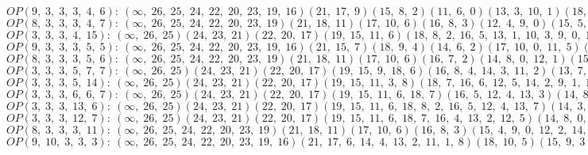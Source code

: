 $OP(9, \;3, \;3, \;3, \;4, \;6): \:(\infty, \;26, \;25, \;24, \;22, \;20, \;23, \;19, \;16)(21, \;17, \;9)(15, \;8, \;2)(11, \;6, \;0)(13, \;3, \;10, \;1)(18, \;7, \;12, \;4, \;14, \;5)$\\
$OP(8, \;3, \;3, \;3, \;4, \;7): \:(\infty, \;26, \;25, \;24, \;22, \;20, \;23, \;19)(21, \;18, \;11)(17, \;10, \;6)(16, \;8, \;3)(12, \;4, \;9, \;0)(15, \;5, \;14, \;2, \;13, \;7, \;1)$\\
$OP(3, \;3, \;3, \;4, \;15): \:(\infty, \;26, \;25)(24, \;23, \;21)(22, \;20, \;17)(19, \;15, \;11, \;6)(18, \;8, \;2, \;16, \;5, \;13, \;1, \;10, \;3, \;9, \;0, \;12, \;4, \;14, \;7)$\\
$OP(9, \;3, \;3, \;3, \;5, \;5): \:(\infty, \;26, \;25, \;24, \;22, \;20, \;23, \;19, \;16)(21, \;15, \;7)(18, \;9, \;4)(14, \;6, \;2)(17, \;10, \;0, \;11, \;5)(13, \;8, \;1, \;12, \;3)$\\
$OP(8, \;3, \;3, \;3, \;5, \;6): \:(\infty, \;26, \;25, \;24, \;22, \;20, \;23, \;19)(21, \;18, \;11)(17, \;10, \;6)(16, \;7, \;2)(14, \;8, \;0, \;12, \;1)(15, \;5, \;13, \;4, \;9, \;3)$\\
$OP(3, \;3, \;3, \;5, \;7, \;7): \:(\infty, \;26, \;25)(24, \;23, \;21)(22, \;20, \;17)(19, \;15, \;9, \;18, \;6)(16, \;8, \;4, \;14, \;3, \;11, \;2)(13, \;7, \;0, \;10, \;5, \;12, \;1)$\\
$OP(3, \;3, \;3, \;5, \;14): \:(\infty, \;26, \;25)(24, \;23, \;21)(22, \;20, \;17)(19, \;15, \;11, \;3, \;8)(18, \;7, \;16, \;6, \;12, \;5, \;14, \;2, \;9, \;1, \;13, \;0, \;10, \;4)$\\
$OP(3, \;3, \;3, \;6, \;6, \;7): \:(\infty, \;26, \;25)(24, \;23, \;21)(22, \;20, \;17)(19, \;15, \;11, \;6, \;18, \;7)(16, \;5, \;12, \;4, \;13, \;3)(14, \;8, \;2, \;9, \;1, \;10, \;0)$\\
$OP(3, \;3, \;3, \;13, \;6): \:(\infty, \;26, \;25)(24, \;23, \;21)(22, \;20, \;17)(19, \;15, \;11, \;6, \;18, \;8, \;2, \;16, \;5, \;12, \;4, \;13, \;7)(14, \;3, \;10, \;0, \;9, \;1)$\\
$OP(3, \;3, \;3, \;12, \;7): \:(\infty, \;26, \;25)(24, \;23, \;21)(22, \;20, \;17)(19, \;15, \;11, \;6, \;18, \;7, \;16, \;4, \;13, \;2, \;12, \;5)(14, \;8, \;0, \;10, \;3, \;9, \;1)$\\
$OP(8, \;3, \;3, \;3, \;11): \:(\infty, \;26, \;25, \;24, \;22, \;20, \;23, \;19)(21, \;18, \;11)(17, \;10, \;6)(16, \;8, \;3)(15, \;4, \;9, \;0, \;12, \;2, \;14, \;5, \;13, \;7, \;1)$\\
$OP(9, \;10, \;3, \;3, \;3): \:(\infty, \;26, \;25, \;24, \;22, \;20, \;23, \;19, \;16)(21, \;17, \;6, \;14, \;4, \;13, \;2, \;11, \;1, \;8)(18, \;10, \;5)(15, \;9, \;3)(12, \;7, \;0)$\\

